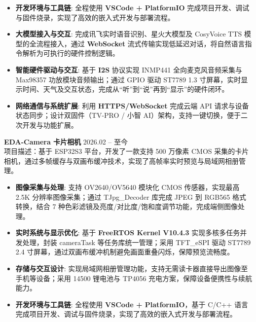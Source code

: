 \documentclass[11pt]{article}
\newlength{\interProjectSpacing}
\newcommand{\projectsep}{\vspace{\interProjectSpacing}}
\newlength{\intraProjectTitleSep}
\newcommand{\titlebreak}{\\[\intraProjectTitleSep]}
\newlength{\intraProjectListTopSep}
\begin{document}
\begin{itemize}[nosep, topsep=\intraProjectListTopSep]
    \item \textbf{开发环境与工具链}: 全程使用 \textbf{VSCode + PlatformIO} 完成项目开发、调试与固件烧录，实现了高效的嵌入式开发与部署流程。
    \item \textbf{大模型接入与交互}: 完成讯飞实时语音识别、星火大模型及 CosyVoice TTS 模型的全流程接入，通过 \textbf{WebSocket} 流式传输实现低延迟对话，将自然语言指令解析为可执行的硬件控制逻辑。
    \item \textbf{智能硬件驱动与交互}: 基于 \textbf{I2S} 协议实现 INMP441 全向麦克风音频采集与 Max98357 功放模块音频输出；通过 GPIO 驱动 ST7789 1.3 寸屏幕，实时显示时间、天气及交互状态，完成从“听”到“说”再到“显示”的硬件闭环。
    \item \textbf{网络通信与系统扩展}: 利用 \textbf{HTTPS/WebSocket} 完成云端 API 请求与设备状态同步；设计双固件（TV-PRO / 小智 AI）架构，支持一键切换，便于二次开发与功能扩展。
    
\end{itemize}

\projectsep

\textbf{EDA-Camera 卡片相机} \hfill 2026.02 -- 至今 \titlebreak

项目描述：基于 ESP32S3 平台，开发了一款支持 500 万像素 CMOS 采集的卡片相机，通过多帧缓存与双画布缓冲技术，实现了高帧率实时预览与局域网相册管理。

\begin{itemize}[nosep, topsep=\intraProjectListTopSep]
    \item \textbf{图像采集与处理}: 支持 OV2640/OV5640 模块化 CMOS 传感器，实现最高 2.5K 分辨率图像采集；通过 TJpg\_Decoder 库完成 JPEG 到 RGB565 格式转换，结合 7 种色彩滤镜及亮度/对比度/饱和度调节功能，完成端侧图像处理。
    \item \textbf{实时系统与显示优化}: 基于 \textbf{FreeRTOS Kernel V10.4.3} 实现多核多任务并发处理，封装 cameraTask 等任务库统一管理；采用 TFT\_eSPI 驱动 ST7789 2.4 寸屏幕，通过双画布缓冲机制避免画面重叠闪烁，保障预览流畅度。
    \item \textbf{存储与交互设计}: 实现局域网相册管理功能，支持无需读卡器直接导出图像至手机等设备；采用 14500 锂电池与 TP4056 充电方案，保障设备便携性与续航能力。
    \item \textbf{开发环境与工具链}: 全程使用 \textbf{VSCode + PlatformIO}，基于 C/C++ 语言完成项目开发、调试与固件烧录，实现了高效的嵌入式开发与部署流程。
\end{itemize}
\end{document}

